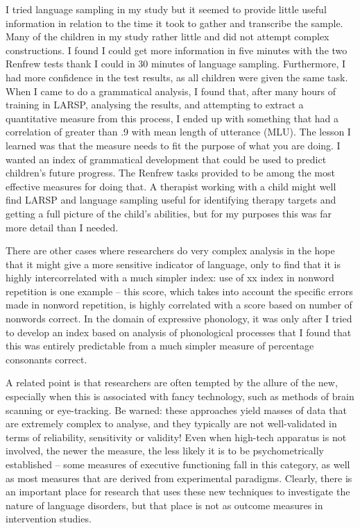 \documentclass[]{book}
\begin{document}
I tried language sampling in my study but it seemed to provide little useful information in relation to the time it took to gather and transcribe the sample. Many of the children in my study rather little and did not attempt complex constructions. I found I could get more information in five minutes with the two Renfrew tests thank I could in 30 minutes of language sampling. Furthermore, I had more confidence in the test results, as all children were given the same task. When I came to do a grammatical analysis, I found that, after many hours of training in LARSP, analysing the results, and attempting to extract a quantitative measure from this process, I ended up with something that had a correlation of greater than .9 with mean length of utterance (MLU). The lesson I learned was that the measure needs to fit the purpose of what you are doing. I wanted an index of grammatical development that could be used to predict children's future progress. The Renfrew tasks provided to be among the most effective measures for doing that. A therapist working with a child might well find LARSP and language sampling useful for identifying therapy targets and getting a full picture of the child's abilities, but for my purposes this was far more detail than I needed.

There are other cases where researchers do very complex analysis in the hope that it might give a more sensitive indicator of language, only to find that it is highly intercorrelated with a much simpler index: use of xx index in nonword repetition is one example -- this score, which takes into account the specific errors made in nonword repetition, is highly correlated with a score based on number of nonwords correct. In the domain of expressive phonology, it was only after I tried to develop an index based on analysis of phonological processes that I found that this was entirely predictable from a much simpler measure of percentage consonants correct.

A related point is that researchers are often tempted by the allure of the new, especially when this is associated with fancy technology, such as methods of brain scanning or eye-tracking. Be warned: these approaches yield masses of data that are extremely complex to analyse, and they typically are not well-validated in terms of reliability, sensitivity or validity! Even when high-tech apparatus is not involved, the newer the measure, the less likely it is to be psychometrically established -- some measures of executive functioning fall in this category, as well as most measures that are derived from experimental paradigms. Clearly, there is an important place for research that uses these new techniques to investigate the nature of language disorders, but that place is not as outcome measures in intervention studies.
\end{document}

